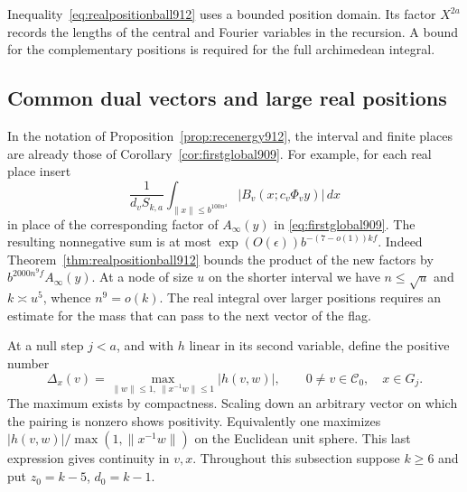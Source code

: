 \documentclass[a4paper,11pt]{article}
\theoremstyle{definition}
\theoremstyle{remark}
\numberwithin{equation}{section}
\begin{document}
Inequality~\eqref{eq:realpositionball912} uses a bounded
position domain. Its factor \(X^{2a}\) records the lengths
of the central and Fourier variables in the recursion.
A bound for the complementary positions is required for the
full archimedean integral.
\clearpage

\subsection{Common dual vectors and large real positions}
\label{sec:commondirection913}

In the notation of Proposition~\ref{prop:recenergy912}, the
interval and finite places are already those of
Corollary~\ref{cor:firstglobal909}. For example, for each real
place insert
\[
 \frac{1}{d_v S_{k,a}}
 \int_{\|x\|\le b^{100n^4}}
             |B_v(x;c_v\Phi_v y)|\,dx
\]
in place of the corresponding factor of \(A_\infty(y)\) in
\eqref{eq:firstglobal909}. The resulting nonnegative sum is
at most \(\exp(O(\epsilon)) b^{-(7-o(1))kf}\). Indeed
Theorem~\ref{thm:realpositionball912} bounds the product of
the new factors by \(b^{2000n^9f}A_\infty(y)\).
At a node of size \(u\) on the shorter interval we have
\(n\le\sqrt u\) and \(k\asymp u^5\), whence \(n^9=o(k)\).
The real integral over larger positions requires an estimate
for the mass that can pass to the next vector of the flag.

At a null step \(j<a\), and with \(h\) linear in its second
variable, define the positive number
\[
  \Delta_x(v)=
     \max_{\|w\|\le1,\ \|x^{-1}w\|\le1}|h(v,w)|,
       \qquad 0\ne v\in\mathcal C_0,\quad x\in G_j .
\]
The maximum exists by compactness. Scaling down an arbitrary
vector on which the pairing is nonzero shows positivity.
Equivalently one maximizes
\(|h(v,w)|/\max(1,\|x^{-1}w\|)\) on the Euclidean unit sphere.
This last expression gives continuity in \(v,x\).
Throughout this subsection suppose \(k\ge6\) and put
\(z_0=k-5\), \(d_0=k-1\).
\end{document}
